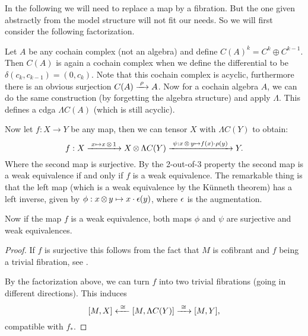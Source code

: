 In the following we will need to replace a map by a fibration. But the one given abstractly from the model structure will not fit our needs. So we will first consider the following factorization.

Let $A$ be any cochain complex (not an algebra) and define $C(A)^k = C^k \oplus C^{k-1}$. Then $C(A)$ is again a cochain complex when we define the differential to be $\delta(c_k, c_{k-1}) = (0, c_k)$. Note that this cochain complex is acyclic, furthermore there is an obvious surjection $C(A) \xrightarrow{\,\,{\rho}\,\,} A$. Now for a cochain algebra $A$, we can do the same construction (by forgetting the algebra structure) and apply $\Lambda$. This defines a cdga $\Lambda C(A)$ (which is still acyclic).

Now let $f: X \to Y$ be any map, then we can tensor $X$ with $\Lambda C(Y)$ to obtain:
$$ f: X \xrightarrow{\,\,{x \mapsto x \operatorname*{\otimes} 1}\,\,} X \operatorname*{\otimes} \Lambda C(Y) \xrightarrow{\,\,{\psi: x \operatorname*{\otimes} y \mapsto f(x) \cdot \rho (y)}\,\,} Y. $$
Where the second map is surjective. By the 2-out-of-3 property the second map is a weak equivalence if and only if $f$ is a weak equivalence. The remarkable thing is that the left map (which is a weak equivalence by the Künneth theorem) has a left inverse, given by $\phi: x \operatorname*{\otimes} y \mapsto x \cdot \epsilon (y)$, where $\epsilon$ is the augmentation.

Now if the map $f$ is a weak equivalence, both maps $\phi$ and $\psi$ are surjective and weak equivalences.

\begin{proof}
	If $f$ is surjective this follows from the fact that $M$ is cofibrant and $f$ being a trivial fibration, see .

	By the factorization above, we can turn $f$ into two trivial fibrations (going in different directions). This induces
	$$ [M, X] \xleftarrow{\,\,{\cong}\,\,} [M, \Lambda C(Y)] \xrightarrow{\,\,{\cong}\,\,} [M, Y], $$
	compatible with $f_\ast$.
\end{proof}


